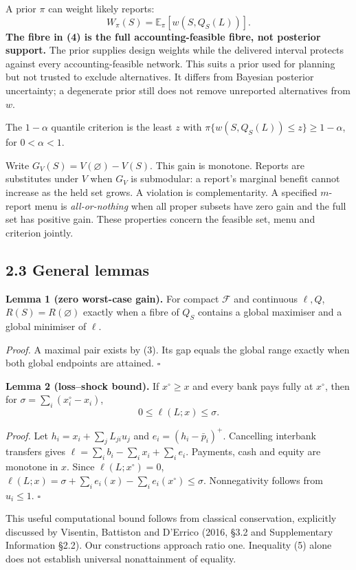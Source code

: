 \documentclass[
  british,
  11pt,
  a4paper,
]{article}
\begin{document}
A prior \(\pi\) can weight likely reports: \[
W_\pi(S)=\mathbb E_\pi[w(S,Q_S(L))].
\tag{4}
\] \textbf{The fibre in (4) is the full accounting-feasible fibre, not
posterior support.} The prior supplies design weights while the
delivered interval protects against every accounting-feasible network.
This suits a prior used for planning but not trusted to exclude
alternatives. It differs from Bayesian posterior uncertainty; a
degenerate prior still does not remove unreported alternatives from
\(w\).

The \(1-\alpha\) quantile criterion is the least \(z\) with
\(\pi\{w(S,Q_S(L))\le z\}\ge1-\alpha\), for \(0<\alpha<1\).

Write \(G_V(S)=V(\varnothing)-V(S)\). This gain is monotone. Reports are
substitutes under \(V\) when \(G_V\) is submodular: a report's marginal
benefit cannot increase as the held set grows. A violation is
complementarity. A specified \(m\)-report menu is \emph{all-or-nothing}
when all proper subsets have zero gain and the full set has positive
gain. These properties concern the feasible set, menu and criterion
jointly.

\subsection{2.3 General lemmas}\label{general-lemmas}

\textbf{Lemma 1 (zero worst-case gain).} For compact \(\mathcal F\) and
continuous \(\ell,Q\), \(R(S)=R(\varnothing)\) exactly when a fibre of
\(Q_S\) contains a global maximiser and a global minimiser of \(\ell\).

\emph{Proof.} A maximal pair exists by (3). Its gap equals the global
range exactly when both global endpoints are attained. \(\square\)

\textbf{Lemma 2 (loss--shock bound).} If \(x^\circ\ge x\) and every bank
pays fully at \(x^\circ\), then for \(\sigma=\sum_i(x_i^\circ-x_i)\), \[
0\le\ell(L;x)\le\sigma.
\tag{5}
\]

\emph{Proof.} Let \(h_i=x_i+\sum_jL_{ji}u_j\) and
\(e_i=(h_i-\bar p_i)^+\). Cancelling interbank transfers gives
\(\ell=\sum_i b_i-\sum_i x_i+\sum_i e_i\). Payments, cash and equity are
monotone in \(x\). Since \(\ell(L;x^\circ)=0\),
\(\ell(L;x)=\sigma+\sum_i e_i(x)-\sum_i e_i(x^\circ)\le\sigma\).
Nonnegativity follows from \(u_i\le1\). \(\square\)

This useful computational bound follows from classical conservation,
explicitly discussed by Visentin, Battiston and D'Errico (2016, §3.2 and
Supplementary Information §2.2). Our constructions approach ratio one.
Inequality (5) alone does not establish universal nonattainment of
equality.
\end{document}
